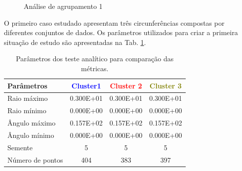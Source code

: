 \begin{figure}[H]
	\centering
	\setlength{\fboxsep}{8pt}
	\setlength{\fboxrule}{0.1pt}
	\caption{Análise de agrupamento 1}
	\label{AC1}
\end{figure}

O primeiro caso estudado apresentam três circunferências compostas por diferentes conjuntos de dados. Os parâmetros utilizados para criar a primeira situação de estudo são apresentadas na Tab. \ref{analise1}.

\begin{table}[H]
	\centering
	\caption{Parâmetros dos teste analítico para comparação das métricas.}
	\label{analise1}
	\begin{tabular}{lccc}
		\hline
		Parâmetros       & \textcolor{blue}{Cluster1} & \textcolor{red}{Cluster 2} & \textcolor{olive}{Cluster 3} \\ \hline
		Raio máximo      & 0.300E+01 & 0.300E+01 & 0.300E+01 \\
		Raio mínimo      & 0.000E+00 & 0.000E+00 & 0.000E+00 \\
		Ângulo máximo    & 0.157E+02 & 0.157E+02 & 0.157E+02 \\
		Ângulo mínimo    & 0.000E+00 & 0.000E+00 & 0.000E+00 \\
		Semente                & 5                 & 5                  & 5         \\
		Número de pontos & 404       & 383       & 397   \\        \hline
	\end{tabular}
\end{table}


